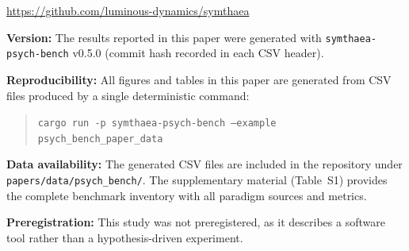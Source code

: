 \documentclass[11pt,letterpaper]{article}
\begin{document}
\begin{center}
\url{https://github.com/luminous-dynamics/symthaea}
\end{center}

\noindent\textbf{Version:} The results reported in this paper were generated with \texttt{symthaea-psych-bench} v0.5.0 (commit hash recorded in each CSV header).

\noindent\textbf{Reproducibility:} All figures and tables in this paper are generated from CSV files produced by a single deterministic command:
\begin{quote}
\texttt{cargo run -p symthaea-psych-bench --example psych\_bench\_paper\_data}
\end{quote}

\noindent\textbf{Data availability:} The generated CSV files are included in the repository under \texttt{papers/\allowbreak{}data/\allowbreak{}psych\_bench/}. The supplementary material (Table~S1) provides the complete benchmark inventory with all paradigm sources and metrics.

\noindent\textbf{Preregistration:} This study was not preregistered, as it describes a software tool rather than a hypothesis-driven experiment.



\end{document}

